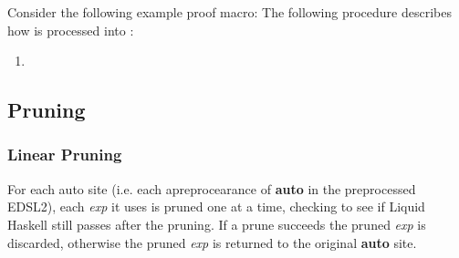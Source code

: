 
Consider the following example proof macro:
%  
The following procedure describes how  is processed into \LangB:
\begin{enumerate}
  \item 
\end{enumerate}
  
\subsection{Pruning}

\subsubsection{Linear Pruning}

For each auto site (i.e. each apreprocearance of \textbf{auto} in the preprocessed EDSL2), each \textit{exp} it uses is pruned one at a time, checking to see if Liquid Haskell still passes after the pruning. If a prune succeeds the pruned \textit{exp} is discarded, otherwise the pruned \textit{exp} is returned to the original \textbf{auto} site.
